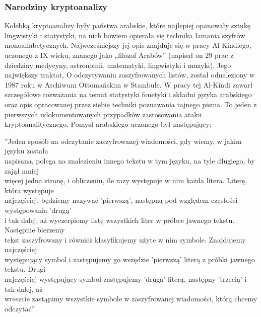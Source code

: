 \documentclass[a4paper]{article}
\begin{document}
\subsubsection{Narodziny kryptoanalizy}
Kolebką kryptoanalizy były państwa arabskie, które najlepiej opanowały sztukę lingwistyki i statystyki,
na nich bowiem opierała się technika łamania szyfrów monoalfabetycznych. Najwcześniejszy
jej opis znajduje się w pracy Al-Kindiego, uczonego z IX wieku, znanego jako „filozof Arabów”
(napisał on 29 prac z dziedziny medycyny, astronomii, matematyki, lingwistyki i muzyki). Jego
największy traktat, O odczytywaniu zaszyfrowanych listów, został odnaleziony w 1987 roku w Archiwum
Ottomańskim w Stambule. W pracy tej Al-Kindi zawarł szczegółowe rozważania na temat
statystyki fonetyki i składni języka arabskiego oraz opis opracowanej przez siebie techniki poznawania
tajnego pisma. To jeden z pierwszych udokumentowanych przypadków zastosowania ataku
kryptoanalitycznego. Pomysł arabskiego uczonego był następujący:
\begin{center}
”Jeden sposób na odczytanie zaszyfrowanej wiadomości, gdy wiemy, w jakim języku została \\

napisana, polega na znalezieniu innego tekstu w tym języku, na tyle długiego, by zajął mniej \\

więcej jedna stronę, i obliczeniu, ile razy występuje w nim każda litera. Literę, która występuje \\

najczęściej, będziemy nazywać ’pierwszą’, następną pod względem częstości występowania ’drugą’ \\

i tak dalej, aż wyczerpiemy listę wszystkich liter w próbce jawnego tekstu. Następnie bierzemy \\

tekst zaszyfrowany i również klasyfikujemy użyte w nim symbole. Znajdujemy najczęściej \\

występujący symbol i zastępujemy go wszędzie ’pierwszą’ literą z próbki jawnego tekstu. Drugi \\

najczęściej występujący symbol zastępujemy ’drugą’ literą, następny ’trzecią’ i tak dalej, aż \\

wreszcie zastąpimy wszystkie symbole w zaszyfrowanej wiadomości, którą chcemy odczytać”\cite{text2} \\
\end{center}
\end{document}
